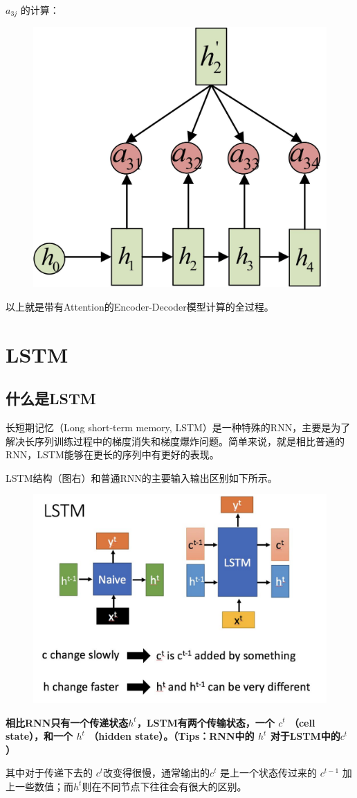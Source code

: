 \documentclass[12pt]{article}
\begin{document}
$a_{3j}$ 的计算：
\begin{figure}[H]
    \centering
    \includegraphics[width=.4\textwidth]{fig/Attention_Compute_A_3.jpg}
\end{figure}

以上就是带有Attention的Encoder-Decoder模型计算的全过程。



\section{ LSTM\cite{Everyone_Can_Understand_LSTM}}
\subsection{什么是LSTM}
长短期记忆（Long short-term memory, LSTM）是一种特殊的RNN，主要是为了解决长序列训练过程中的梯度消失和梯度爆炸问题。简单来说，就是相比普通的RNN，LSTM能够在更长的序列中有更好的表现。

LSTM结构（图右）和普通RNN的主要输入输出区别如下所示。
\begin{figure}[H]
    \centering
    \includegraphics[width=.6\textwidth]{fig/LSTM_Compare_RNN_LSTM.png}
\end{figure}

\textbf{相比RNN只有一个传递状态$h^t$，LSTM有两个传输状态，一个 $c^t$ （cell state），和一个 $h^t$ （hidden state）。（Tips：RNN中的 $h^t$ 对于LSTM中的$c^t$ ）}

其中对于传递下去的 $c^t$改变得很慢，通常输出的$c^t$ 是上一个状态传过来的 $c^{t-1}$ 加上一些数值；而$h^t$则在不同节点下往往会有很大的区别。
\end{document}
